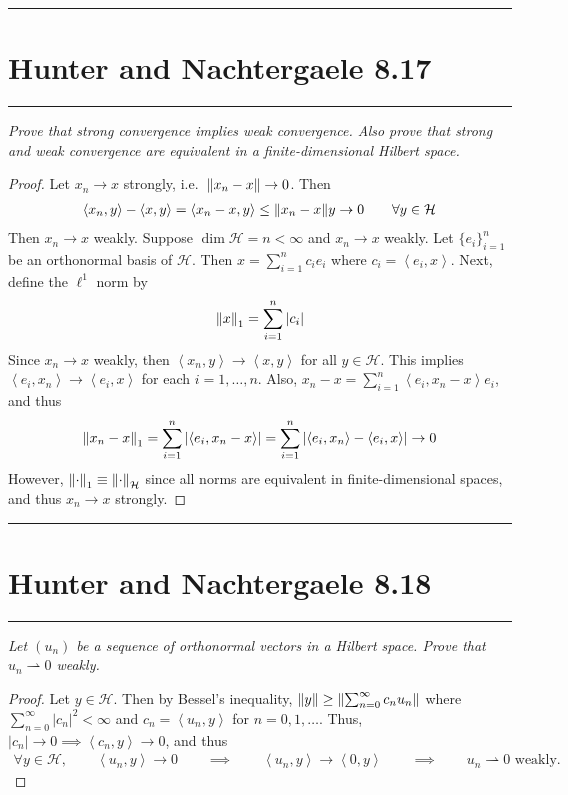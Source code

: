 \documentclass{article} %
\theoremstyle{plain}
\newcommand{\VEC}[2]{\left\langle #1, #2 \right\rangle}
\newcommand{\Hilb}{\mathcal{H}}
\newcommand{\problem}[1]{
\vspace{.375cm}
\begin{minipage}{\textwidth}
    \begin{center}
        \noindent\rule{5cm}{1pt}
    \end{center}
    \section{\bf #1}
    \begin{center}
        \noindent\rule{5cm}{1pt}
    \end{center}
    \vspace{0.25cm}
\end{minipage}
}
\numberwithin{equation}{section} %
\numberwithin{figure}{section} %
\numberwithin{table}{section} %
\begin{document}
\problem{Hunter and Nachtergaele 8.17}
\emph{Prove that strong convergence implies weak convergence.  Also prove that strong and weak convergence are equivalent in a finite-dimensional Hilbert space.}

\begin{proof}
    Let $x_n \rightarrow x$ strongly, i.e.~$\norm{x_n - x} \rightarrow 0$.  Then
    \begin{align*}
        \VEC{x_n}{y} - \VEC{x}{y} = \VEC{x_n - x}{y} \leq \norm{x_n - x}{y} \rightarrow 0 \qquad \forall y \in \Hilb
    \end{align*}
    Then $x_n \rightarrow x$ weakly.  Suppose $\dim \Hilb = n < \infty$ and $x_n \rightarrow x$ weakly.  Let $\{e_i\}_{i=1}^n$ be an orthonormal basis of $\Hilb$.  Then $x = \sum_{i=1}^nc_ie_i$ where $c_i = \VEC{e_i}{x}$.  Next, define the $\ell^1$ norm by
    \begin{align*}
        \norm{x}_1 = \sum_{i=1}^n\left|c_i\right|
    \end{align*}
    Since $x_n \rightarrow x$ weakly, then $\VEC{x_n}{y} \rightarrow \VEC{x}{y}$ for all $y \in \Hilb$.  This implies $\VEC{e_i}{x_n} \rightarrow \VEC{e_i}{x}$ for each $i = 1, \dots, n$.  Also, $x_n - x = \sum_{i=1}^n \VEC{e_i}{x_n - x}e_i$, and thus
    \begin{align*}
        \norm{x_n - x}_1 = \sum_{i=1}^n \left|\VEC{e_i}{x_n - x}\right| = \sum_{i=1}^n \left|\VEC{e_i}{x_n} - \VEC{e_i}{x}\right| \rightarrow 0
    \end{align*}
    However, $\norm{\cdot}_1 \equiv \norm{\cdot}_\Hilb$ since all norms are equivalent in finite-dimensional spaces, and thus $x_n \rightarrow x$ strongly.
\end{proof}







\problem{Hunter and Nachtergaele 8.18}
\emph{Let $(u_n)$ be a sequence of orthonormal vectors in a Hilbert space.  Prove that $u_n \rightharpoonup 0$ weakly.}

\begin{proof}
    Let $y \in \Hilb$.  Then by Bessel's inequality, $\norm{y} \geq \norm{\sum_{n=0}^\infty c_n u_n}$ where $\sum_{n=0}^\infty |c_n|^2 < \infty$ and $c_n = \VEC{u_n}{y}$ for $n = 0, 1, \dots$.  Thus, $|c_n| \rightarrow 0 \implies \VEC{c_n}{y} \rightarrow 0$, and thus
    \begin{align*}
        \forall y \in \Hilb,\qquad \VEC{u_n}{y} \rightarrow 0 \qquad \implies \qquad \VEC{u_n}{y} \rightarrow \VEC{0}{y} \qquad \implies \qquad u_n \rightharpoonup 0 \text{ weakly.}
    \end{align*}
\end{proof}
\end{document}
